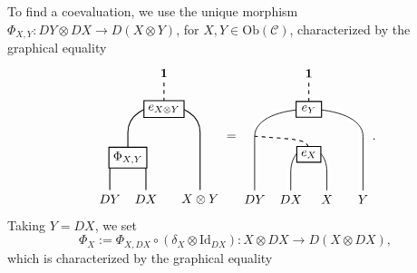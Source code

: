 \documentclass[11pt, reqno]{amsart}
\theoremstyle{definition}\newtheorem{defi}[thm]{Definition}
\theoremstyle{definition}\newtheorem{rem}[thm]{Remark}
\theoremstyle{definition}\newtheorem{exam}[thm]{Example}
\theoremstyle{definition}\newtheorem{assum}[thm]{Assumption}
\newcommand{\cC}{\mathcal{C}}
\newcommand{\Id}{\mathrm{Id}}
\newcommand{\vac}{\mathbf{1}}
\begin{document}
To find a coevaluation, we use the unique morphism $\Phi_{X,Y}: DY\otimes DX\rightarrow D(X\otimes Y)$, for $X,Y\in\mathrm{Ob}(\cC)$, characterized by the graphical equality
\begin{equation*}
 \begin{matrix}
    \begin{tikzpicture}[scale = 1, baseline = {(current bounding box.center)}, line width=0.75pt]
    \draw (0,0) -- (0,.5) .. controls (0,.8) .. (.5,.8) .. controls (1,.8) .. (1,.5) -- (1,0);
    \draw[dashed] (1.5, 2.25) -- (1.5,3);
    \draw (.5,1) -- (.5,1.6) .. controls (.5,2.6) and (2.5,2.6) .. (2.5,1.6) -- (2.5, 1);
    \draw (2.5,0) -- (2.5,1);
    \node at (0,-.25) {$DY$};
    \node at (1,-.25) {$DX$};
    \node at (2.5,-.25) {$X\otimes Y$};
    \node at (1.5,3.25) {$\vac$};
    \node at (.5,.9) [draw,minimum width=20pt,minimum height=10pt,thick, fill=white] {$\Phi_{X,Y}$};
    \node at (1.5,2.25) [draw,minimum width=20pt,minimum height=10pt,thick, fill=white] {$e_{X\otimes Y}$};
    \end{tikzpicture}
   \end{matrix} =
   \begin{matrix}
    \begin{tikzpicture}[scale = 1, baseline = {(current bounding box.center)}, line width=0.75pt]
     \draw[white, double=black, line width = 3pt ] (1,0) -- (1,.5) .. controls (1,1.4) and (2,1.4) .. (2,0.5) -- (2,0);                      
    \draw[white, double=black, line width = 3pt ] (0,0) -- (0,1.5) .. controls (0,2.5) and (3,2.5) .. (3,1.5) -- (3,0);
    \draw[dashed] (1.5,1) .. controls (1.5,1.4) .. (0,1.5);
    \draw[dashed] (1.5,2.25) -- (1.5,3);
    \node at (0,-.25) {$DY$};
    \node at (1,-.25) {$DX$};
    \node at (2,-.25) {$X$};
    \node at (3,-.25) {$Y$};
    \node at (1.5,3.25) {$\vac$};
    \node at (1.5,1) [draw,minimum height=10pt,thick, fill=white] {$e_X$};
    \node at (1.5,2.25) [draw,minimum width=20pt,minimum height=10pt,thick, fill=white] {$e_Y$};
    \end{tikzpicture}
   \end{matrix}.
\end{equation*}
Taking $Y=DX$, we set
\begin{equation*}
\Phi_X :=\Phi_{X,DX}\circ(\delta_X\otimes\Id_{DX}): X\otimes DX\rightarrow D(X\otimes DX),
\end{equation*}
which is characterized by the graphical equality
\end{document}
